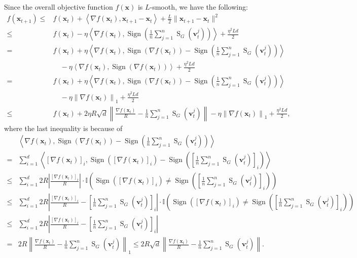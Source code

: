 \documentclass{article}
\DeclareMathOperator{\sign}{sign}
\newcommand{\Norm}[1]{\left\|#1\right\|}
\def \v {\mathbf{v}}
\def \x {\mathbf{x}}
\def \sign  {\operatorname{Sign}}
\def \x {\mathbf{x}}
\def \v {\mathbf{v}}
\begin{document}
Since the overall objective function $f(\x)$ is $L$-smooth, we have the following:
\begin{equation}\label{majorvote}
    \begin{split}
        f(\x_{t+1})\leq& f(\x_t) + \left\langle \nabla f(\x_t), \x_{t+1} - \x_t \right\rangle + \frac{L}{2} \| \x_{t+1} - \x_t \|^2 \\
\leq& f(\x_t) -\eta \left\langle \nabla f(\x_t), \operatorname{Sign}\left(\frac{1}{n}\sum_{j=1}^n \operatorname{S}_G(\v_t^j) \right)\right\rangle + \frac{\eta^2 Ld}{2}\\
=& f(\x_t)+  \eta \left\langle \nabla f(\x_t), \sign(\nabla f(\x_t))-\operatorname{Sign}\left(\frac{1}{n}\sum_{j=1}^n \operatorname{S}_G(\v_t^j) \right)\right\rangle\\
&\quad - \eta\left\langle \nabla f(\x_t), \sign(\nabla f(\x_t)) \right\rangle + \frac{\eta^2 Ld}{2} \\
=& f(\x_t)+  \eta \left\langle \nabla f(\x_t), \sign(\nabla f(\x_t))-\operatorname{Sign}\left(\frac{1}{n}\sum_{j=1}^n \operatorname{S}_G(\v_t^j) \right)\right\rangle
\\&\quad -\eta  \Norm{ \nabla f(\x_t)}_1 + \frac{\eta^2 Ld}{2} \\
\leq& f(\x_t)+ 2\eta R\sqrt{d}   \Norm{\frac{\nabla f(\x_t)}{R} - \frac{1}{n}\sum_{j=1}^n \operatorname{S}_G(\v_t^j)} -\eta  \Norm{ \nabla f(\x_t)}_1+ \frac{\eta^2 Ld}{2},
    \end{split}
\end{equation}
where the last inequality is because of
\begin{equation}\label{equality2}
\begin{aligned}
&\left\langle \nabla f(\x_t), \sign(\nabla f(\x_t)) - \operatorname{Sign}\left(\frac{1}{n}\sum_{j=1}^n \operatorname{S}_G(\v_t^j) \right) \right\rangle \\
= &\sum_{i=1}^{d} \left\langle [\nabla f(\x_t)]_i, \sign([\nabla f(\x_t)]_i) - \sign\left(\left[\frac{1}{n}\sum_{j=1}^n \operatorname{S}_G(\v_t^j)\right]_i\right) \right\rangle  \\
\leq &\sum_{i=1}^{d} 2R\left|\frac{[\nabla f(\x_t)]_i }{R}\right| \cdot \mathbb{I} \left( \sign(\left[\nabla f(\x_t)\right]_i) \neq \sign\left(\left[\frac{1}{n}\sum_{j=1}^n \operatorname{S}_G(\v_t^j)\right]_i\right) \right) \\
\leq & \sum_{i=1}^{d} 2R\left|\frac{[\nabla f(\x_t)]_i}{R} - \left[\frac{1}{n}\sum_{j=1}^n \operatorname{S}_G(\v_t^j)\right]_i\right| \cdot \mathbb{I} \left( \sign(\left[\nabla f(\x_t)\right]_i) \neq \sign\left(\left[\frac{1}{n}\sum_{j=1}^n \operatorname{S}_G(\v_t^j)\right]_i\right) \right) \\
\leq &\sum_{i=1}^{d} 2R\left|\frac{[\nabla f(\x_t)]_i}{R} - \left[\frac{1}{n}\sum_{j=1}^n \operatorname{S}_G(\v_t^j)\right]_i\right| \\
= & 2R\Norm{\frac{\nabla f(\x_t)}{R} -\frac{1}{n}\sum_{j=1}^n \operatorname{S}_G(\v_t^j)}_1
\leq  2R\sqrt{d} \Norm{\frac{\nabla f(\x_t)}{R} - \frac{1}{n}\sum_{j=1}^n \operatorname{S}_G(\v_t^j)}.
\end{aligned}    
\end{equation}
\end{document}
